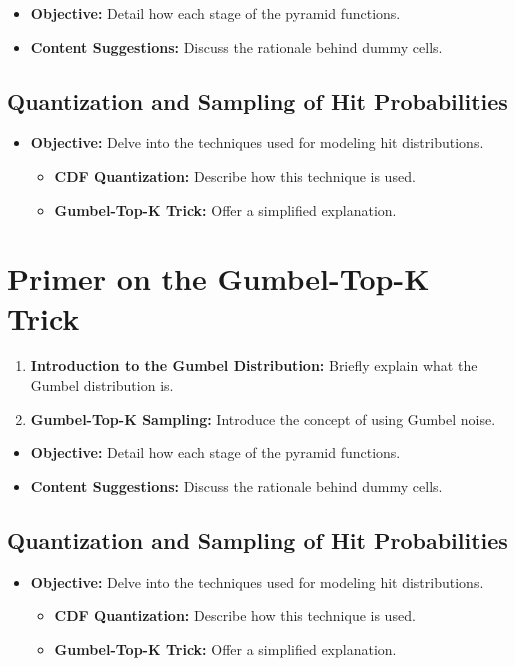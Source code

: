 \begin{itemize}
\item \textbf{Objective:} Detail how each stage of the pyramid functions.
\item \textbf{Content Suggestions:} Discuss the rationale behind dummy cells.
\end{itemize}

\subsection{Quantization and Sampling of Hit Probabilities}

\begin{itemize}
\item \textbf{Objective:} Delve into the techniques used for modeling hit distributions.
\begin{itemize}
\item \textbf{CDF Quantization:} Describe how this technique is used.
\item \textbf{Gumbel-Top-K Trick:} Offer a simplified explanation.
\end{itemize}
\end{itemize}

\section{Primer on the Gumbel-Top-K Trick}

\begin{enumerate}
\item \textbf{Introduction to the Gumbel Distribution:} Briefly explain what the Gumbel distribution is.
\item \textbf{Gumbel-Top-K Sampling:} Introduce the concept of using Gumbel noise.
\end{enumerate}
\begin{itemize}
\item \textbf{Objective:} Detail how each stage of the pyramid functions.
\item \textbf{Content Suggestions:} Discuss the rationale behind dummy cells.
\end{itemize}

\subsection{Quantization and Sampling of Hit Probabilities}

\begin{itemize}
\item \textbf{Objective:} Delve into the techniques used for modeling hit distributions.
\begin{itemize}
\item \textbf{CDF Quantization:} Describe how this technique is used.
\item \textbf{Gumbel-Top-K Trick:} Offer a simplified explanation.
\end{itemize}
\end{itemize}

